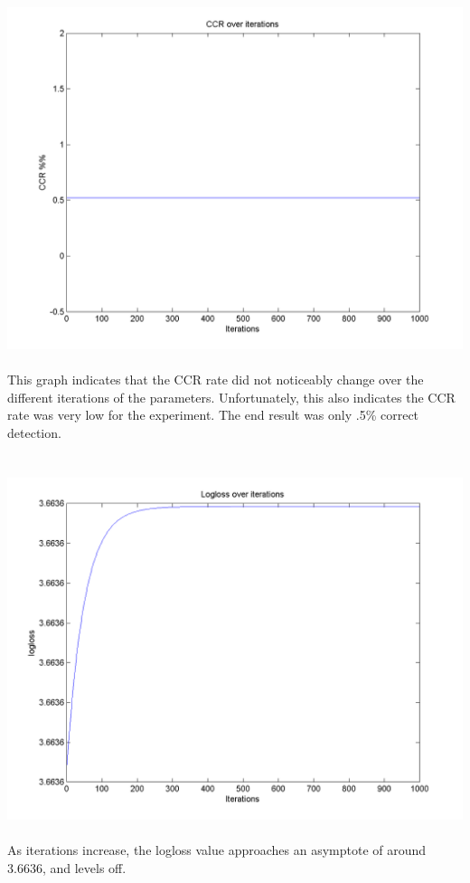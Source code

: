 \documentclass[paper=a4, fontsize=11pt]{scrartcl} %
\numberwithin{equation}{section} %
\numberwithin{figure}{section} %
\numberwithin{table}{section} %
\begin{document}
	\includegraphics[scale=.8]{CCR}
	\\\\
	This graph indicates that the CCR rate did not noticeably change over the different iterations of the parameters. Unfortunately, this also indicates the CCR rate was very low for the experiment. The end result was only .5\% correct detection.
	\\\\\\
	\includegraphics[scale=0.8]{logloss}
	\\\\
	As iterations increase, the logloss value approaches an asymptote of around 3.6636, and levels off.
\end{document}
